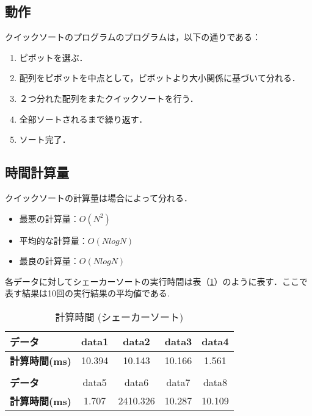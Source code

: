 \documentclass[a4j, titlepage]{jarticle}
\begin{document}
        \subsection{動作}
            クイックソートのプログラムのプログラムは，以下の通りである：
            \begin{screen}
                \begin{enumerate}
                    \item ピボットを選ぶ．
                    \item 配列をピボットを中点として，ピボットより大小関係に基づいて分れる．
                    \item ２つ分れた配列をまたクイックソートを行う．
                    \item 全部ソートされるまで繰り返す．
                    \item ソート完了．
                \end{enumerate}
            \end{screen}
        
        \subsection{時間計算量}
            クイックソートの計算量は場合によって分れる．
            \begin{itemize}
                \item 最悪の計算量：$O(N^2)$
                \item 平均的な計算量：$O(NlogN)$
                \item 最良の計算量：$O(NlogN)$
            \end{itemize}

            各データに対してシェーカーソートの実行時間は表（\ref{tab:quick}）のように表す．ここで表す結果は10回の実行結果の平均値である.

            \begin{table}[tbh]
                \caption{計算時間 (シェーカーソート)}
                \label{tab:quick}
                \begin{center}
                    \begin{tabular}{lcccc}
                        \hline
                        \textbf{データ} & data1 & data2 &data3 &data4 \\ \hline
                        \textbf{計算時間(ms)} & 10.394 & 10.143 & 10.166 & 1.561 \\ \hline
                        \\ \hline
                        \textbf{データ} & data5 &data6 &data7 &data8\\ \hline
                        \textbf{計算時間(ms)} & 1.707 & 2410.326 & 10.287 & 10.109 \\ \hline
                    \end{tabular}
                \end{center}
            \end{table}
\end{document}
